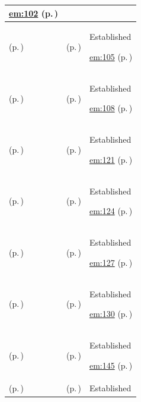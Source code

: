 \begin{longtable}{|>{\raggedright\arraybackslash}p{0.27\TableWidth}|>{\raggedright\arraybackslash}p{0.27\TableWidth}|>{\raggedright\arraybackslash}p{0.46\TableWidth}|}
 \hyperref[rad:em:86]{em:102} (p.\,\pageref{rad:em:86})\\\hline
\nameref{function:maintain-practitioner-affiliations} (p.\,\pageref{function:maintain-practitioner-affiliations}) & \nameref{feature:feat-em-15} (p.\,\pageref{feature:feat-em-15}) & Established

 \hyperref[rad:em:86]{em:105} (p.\,\pageref{rad:em:86})\\\hline
\nameref{function:maintain-clinical-privileges} (p.\,\pageref{function:maintain-clinical-privileges}) & \nameref{feature:feat-em-16} (p.\,\pageref{feature:feat-em-16}) & Established

 \hyperref[rad:em:86]{em:108} (p.\,\pageref{rad:em:86})\\\hline
\nameref{function:verify-healthcare-organisation} (p.\,\pageref{function:verify-healthcare-organisation}) & \nameref{feature:feat-em-17} (p.\,\pageref{feature:feat-em-17}) & Established

 \hyperref[rad:em:118]{em:121} (p.\,\pageref{rad:em:118})\\\hline
\nameref{function:govern-organisation-profile} (p.\,\pageref{function:govern-organisation-profile}) & \nameref{feature:feat-em-18} (p.\,\pageref{feature:feat-em-18}) & Established

 \hyperref[rad:em:118]{em:124} (p.\,\pageref{rad:em:118})\\\hline
\nameref{function:maintain-organisational-structure} (p.\,\pageref{function:maintain-organisational-structure}) & \nameref{feature:feat-em-19} (p.\,\pageref{feature:feat-em-19}) & Established

 \hyperref[rad:em:118]{em:127} (p.\,\pageref{rad:em:118})\\\hline
\nameref{function:maintain-organisation-contacts} (p.\,\pageref{function:maintain-organisation-contacts}) & \nameref{feature:feat-em-20} (p.\,\pageref{feature:feat-em-20}) & Established

 \hyperref[rad:em:118]{em:130} (p.\,\pageref{rad:em:118})\\\hline
\nameref{function:maintain-healthcare-location} (p.\,\pageref{function:maintain-healthcare-location}) & \nameref{feature:feat-em-21} (p.\,\pageref{feature:feat-em-21}) & Established

 \hyperref[rad:em:140]{em:145} (p.\,\pageref{rad:em:140})\\\hline
\nameref{function:maintain-physical-location-hierarchy} (p.\,\pageref{function:maintain-physical-location-hierarchy}) & \nameref{feature:feat-em-22} (p.\,\pageref{feature:feat-em-22}) & Established


\end{longtable}
